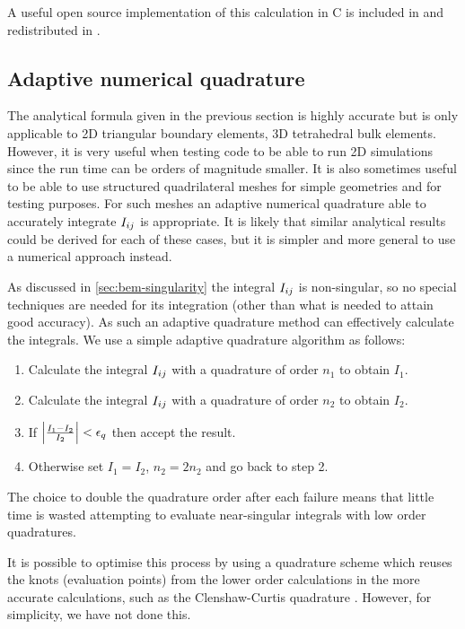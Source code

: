 A useful open source implementation of this calculation in C is included in \magpar \cite{magpar-website} and redistributed in \nmag \cite{nmag-website}.


\subsection{Adaptive numerical quadrature}

\newcommand{\tolq}{\epsilon_q}

The analytical formula given in the previous section is highly accurate but is only applicable to 2D triangular boundary elements, \ie 3D tetrahedral bulk elements.
However, it is very useful when testing code to be able to run 2D simulations since the run time can be orders of magnitude smaller.
It is also sometimes useful to be able to use structured quadrilateral meshes for simple geometries and for testing purposes.
For such meshes an adaptive numerical quadrature able to accurately integrate $I_{ij}$ is appropriate.
It is likely that similar analytical results could be derived for each of these cases, but it is simpler and more general to use a numerical approach instead.

As discussed in \cref{sec:bem-singularity} the integral $I_{ij}$ is non-singular, so no special techniques are needed for its integration (other than what is needed to attain good accuracy).
As such an adaptive quadrature method can effectively calculate the integrals.
We use a simple adaptive quadrature algorithm as follows:
\begin{enumerate}
\item Calculate the integral $I_{ij}$ with a quadrature of order $n_1$ to obtain $I_1$.
\item Calculate the integral $I_{ij}$ with a quadrature of order $n_2$ to obtain $I_2$.
\item If $\abs{\frac{I_1 - I_2}{I_2}} < \tolq$ then accept the result.
\item Otherwise set $I_1 = I_2$, $n_2 = 2n_2$ and go back to step 2.
\end{enumerate}
The choice to double the quadrature order after each failure means that little time is wasted attempting to evaluate near-singular integrals with low order quadratures.

It is possible to optimise this process by using a quadrature scheme which reuses the knots (\ie evaluation points) from the lower order calculations in the more accurate calculations, such as the Clenshaw-Curtis quadrature \cite{Trefethen2008}.
However, for simplicity, we have not done this.

